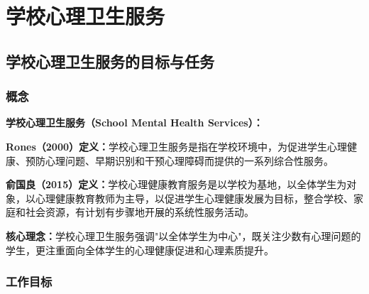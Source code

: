 \chapter{学校心理卫生服务}
\setcounter{chapter}{14}

\section{学校心理卫生服务的目标与任务}

\subsection{概念}

\begin{defbox}
\textbf{学校心理卫生服务（School Mental Health Services）：}

\textbf{Rones（2000）定义：}学校心理卫生服务是指在学校环境中，为促进学生心理健康、预防心理问题、早期识别和干预心理障碍而提供的一系列综合性服务。

\textbf{俞国良（2015）定义：}学校心理健康教育服务是以学校为基地，以全体学生为对象，以心理健康教育教师为主导，以促进学生心理健康发展为目标，整合学校、家庭和社会资源，有计划有步骤地开展的系统性服务活动。

\textbf{核心理念：}学校心理卫生服务强调"以全体学生为中心"，既关注少数有心理问题的学生，更注重面向全体学生的心理健康促进和心理素质提升。
\end{defbox}

\subsection{工作目标}


